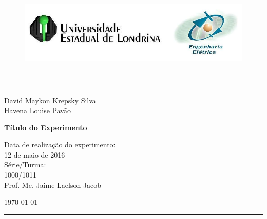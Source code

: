 \begin{titlepage}
\begin{center}
\begin{figure}[h]
\includegraphics[scale=0.76]{Imagens/topdotitulo.png}
\end{figure}
\rule{\columnwidth}{1.5mm}
\

\large David Maykon Krepsky Silva\\
\large Havena Louise Pavão

\vspace{4cm}
{\bf \Large Título do Experimento}
\vspace{3.5cm}

\begin{flushright}
Data de realização do experimento:\\
12 de maio de 2016\\
Série/Turma:\\
1000/1011\\
Prof. Me. Jaime Laelson Jacob 
\end{flushright}

\vspace{3.2cm}
\today

\rule{\columnwidth}{1.3mm}
\end{center}
\end{titlepage}